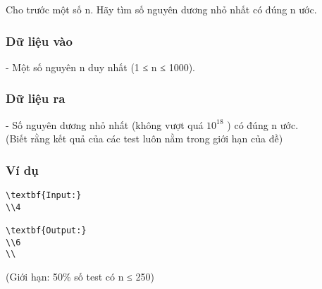 



   Cho trước một số n. Hãy tìm số nguyên dương nhỏ nhất có đúng n ước.  

\subsubsection{   Dữ liệu vào  }

   - Một số nguyên n duy nhất (1 ≤ n ≤ 1000).  

\subsubsection{   Dữ liệu ra  }

   - Số nguyên dương nhỏ nhất (không vượt quá $10^{18}$   ) có đúng n ước.   
\\   (Biết rằng kết quả của các test luôn nằm trong giới hạn của đề)  

\subsubsection{   Ví dụ  }


\begin{verbatim}
\textbf{Input:}
\\4

\textbf{Output:}
\\6
\\\end{verbatim}

   (Giới hạn: 50\% số test có n ≤ 250)  
